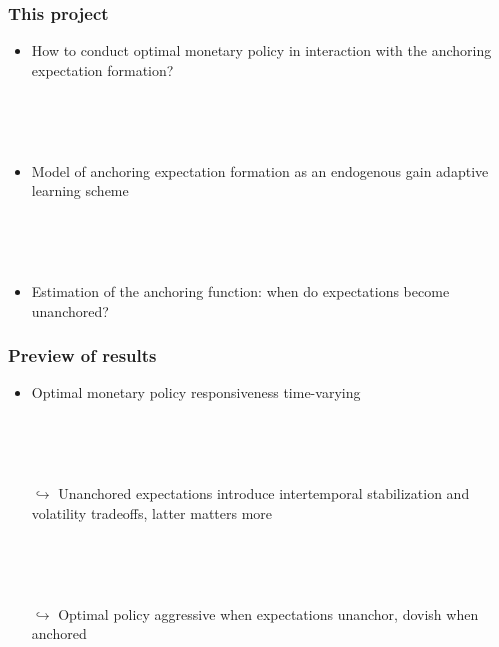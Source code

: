 \documentclass[10pt]{beamer}
\def\ppFEunanchors{1 }
\def\ppFEunanchors{1 }
\def\movei{5 }
\begin{document}
\begin{frame}
	\frametitle{This project}
	
	\begin{itemize}
	\item How to conduct optimal monetary policy in interaction with the anchoring expectation formation?
	
	\
	
	\

	\item Model of anchoring expectation formation as an endogenous gain adaptive learning scheme
	
	\
	
	\
	
	\item Estimation of the anchoring function: when do expectations become unanchored?

	\end{itemize}
	\end{frame}
\begin{frame}
	\frametitle{Preview of results}
	
	\begin{itemize}
%
%	
%	
%	
	\item Optimal monetary policy responsiveness time-varying 
	
	\
	
	\
	
	
	\item[$\hookrightarrow$] Unanchored expectations introduce intertemporal stabilization and volatility tradeoffs, latter matters more 
	
	\
	
	\
	\item[$\hookrightarrow$] Optimal policy aggressive when expectations unanchor, dovish when anchored
	
	\
	
	\
	


	\end{itemize}


\end{frame}
\end{document}
